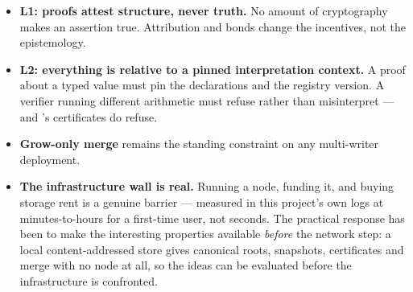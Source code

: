 \begin{itemize}[leftmargin=1.4em]
\item \textbf{L1: proofs attest structure, never truth.} No amount of
  cryptography makes an assertion true. Attribution and bonds change the
  incentives, not the epistemology.
\item \textbf{L2: everything is relative to a pinned interpretation context.}
  A proof about a typed value must pin the declarations and the registry
  version. A verifier running different arithmetic must refuse rather than
  misinterpret --- and \odag{}'s certificates do refuse.
\item \textbf{Grow-only merge} remains the standing constraint on any
  multi-writer deployment.
\item \textbf{The infrastructure wall is real.} Running a node, funding it,
  and buying storage rent is a genuine barrier --- measured in this project's
  own logs at minutes-to-hours for a first-time user, not seconds. The
  practical response has been to make the interesting properties available
  \emph{before} the network step: a local content-addressed store gives
  canonical roots, snapshots, certificates and merge with no node at all, so
  the ideas can be evaluated before the infrastructure is confronted.
\end{itemize}
